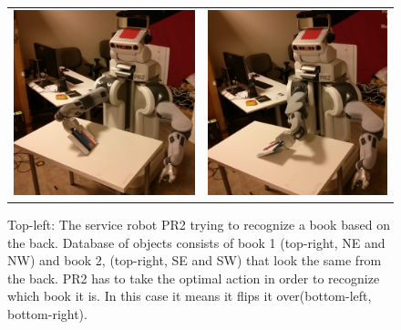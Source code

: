 \begin{figure}[ht]
\begin{tabular}{cccc}
    \multicolumn{2}{c}{\includegraphics[width=0.45\columnwidth]{pics/pr2_grasp.jpg}}
    & \multicolumn{2}{c}{\includegraphics[width=0.45\columnwidth]{pics/pr2_rotate.jpg}}
    \end{tabular}
    \caption{Top-left: The service robot PR2 trying to recognize a book based on the back. Database of objects consists of book 1 (top-right, NE and NW) and book 2, (top-right, SE and SW) that look the same from the back. PR2 has to take the optimal action in order to recognize which book it is. In this case it means it flips it over(bottom-left, bottom-right).}
    \label{fig:pr2}
    \end{figure}


